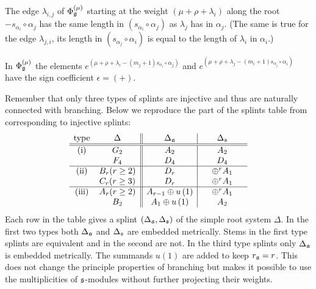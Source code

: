 \begin{Prop}
The edge $\lambda _{i,j}$ of $\Phi _{\frak{g}}^{\left( \mu \right) }$
starting at the weight $\left( \mu +\rho +\lambda _{i}\right) $ along the
root $-s_{\alpha _{i}}\circ \alpha _{j}$ has the same length in $(s_{\alpha
_{i}}\circ \alpha _{j})$ as $\lambda _{j}$ has in $\alpha _{j}$. (The same
is true for the edge $\lambda _{j,i}$, its length in $(s_{\alpha _{j}}\circ
\alpha _{i})$ is equal to the length of $\lambda _{i}$ in $\alpha _{i}$.)
\label{diagram property}
\end{Prop}

In $\Phi _{\frak{g}}^{\left( \mu \right) }$ the elements $e^{\left( \mu
+\rho +\lambda _{i}-(m_{j}+1)s_{\alpha _{i}}\circ \alpha _{j}\right) }$ and $%
e^{\left( \mu +\rho +\lambda _{j}-(m_{i}+1)s_{\alpha _{j}}\circ \alpha
_{i}\right) }$ have the sign coefficient  $\epsilon =(+)$.

Remember that only three types of splints are
injective and thus are naturally connected with branching. Below we
reproduce the part of the splints table from \cite{richter2008splints} corresponding to
injective splints:
\[
\begin{array}{cc||c|c}
\hbox{type} & \hspace{0.25in}\Delta \hspace{0.25in} & \hspace{0.25in}\Delta
_{\frak{a}}\hspace{0.25in} & \hspace{0.25in}\Delta _{\frak{s}}\hspace{0.25in}
\\ \hline\hline
\hbox{(i)} & G_{2} & A_{2} & A_{2} \\
& F_{4} & D_{4} & D_{4} \\ \hline
\hbox{(ii)} & B_{r}(r\geq 2) & D_{r} & \oplus ^{r}A_{1} \\
& C_{r}(r\geq 3) & D_{r} & \oplus ^{r}A_{1} \\ \hline
\hbox{(iii)} & A_{r}(r\geq 2) & A_{r-1}\oplus u\left( 1\right)  & \oplus
^{r}A_{1} \\
& B_{2} & A_{1}\oplus u\left( 1\right)  & A_{2}
\end{array}
\]
Each row in the table gives a splint $(\Delta _{\frak{a}},\Delta _{\frak{s}})
$ of the simple root system $\Delta $. In the first two types both $\Delta _{%
\frak{a}}$ and $\Delta _{\frak{s}}$ are embedded metrically. Stems in the
first type splints are equivalent and in the second are not. In the third
type splints only $\Delta _{\frak{a}}$ is embedded metrically. The summands $%
u\left( 1\right) $ are added to keep $r_{\frak{a}}=r$. This does not change
the principle properties of branching but makes it possible to use the
multiplicities of $\frak{s}$-modules without further projecting their
weights.

